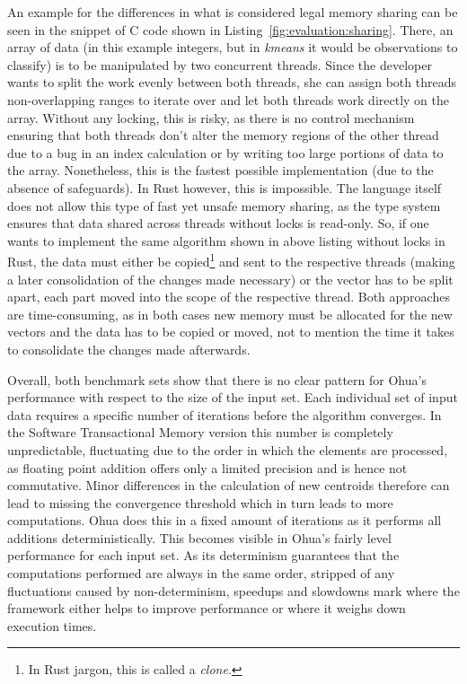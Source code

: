 An example for the differences in what is considered legal memory sharing can be seen in the snippet of C code shown in Listing~\ref{fig:evaluation:sharing}.
There, an array of data (in this example integers, but in \emph{kmeans} it would be observations to classify) is to be manipulated by two concurrent threads.
Since the developer wants to split the work evenly between both threads, she can assign both threads non-overlapping ranges to iterate over and let both threads work directly on the array.
Without any locking, this is risky, as there is no control mechanism ensuring that both threads don't alter the memory regions of the other thread due to a bug in an index calculation or by writing too large portions of data to the array.
Nonetheless, this is the fastest possible implementation (due to the absence of safeguards).
In Rust however, this is impossible.
The language itself does not allow this type of fast yet unsafe memory sharing, as the type system ensures that data shared across threads without locks is read-only.
So, if one wants to implement the same algorithm shown in above listing without locks in Rust, the data must either be copied\footnote{In Rust jargon, this is called a \emph{clone}.} and sent to the respective threads (making a later consolidation of the changes made necessary) or the vector has to be split apart, each part moved into the scope of the respective thread.
Both approaches are time-consuming, as in both cases new memory must be allocated for the new vectors and the data has to be copied or moved, not to mention the time it takes to consolidate the changes made afterwards.

Overall, both benchmark sets show that there is no clear pattern for Ohua's performance with respect to the size of the input set.
Each individual set of input data requires a specific number of iterations before the algorithm converges.
In the Software Transactional Memory version this number is completely unpredictable, fluctuating due to the order in which the elements are processed, as floating point addition offers only a limited precision and is hence not commutative.
Minor differences in the calculation of new centroids therefore can lead to missing the convergence threshold which in turn leads to more computations.
Ohua does this in a fixed amount of iterations as it performs all additions deterministically.
This becomes visible in Ohua's fairly level performance for each input set.
As its determinism guarantees that the computations performed are always in the same order, stripped of any fluctuations caused by non-determinism, speedups and slowdowns mark where the framework either helps to improve performance or where it weighs down execution times.

